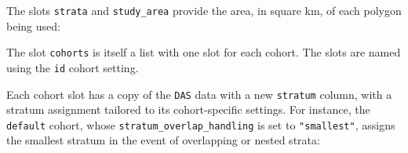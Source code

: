 \documentclass[
]{book}
\newenvironment{Shaded}{\begin{snugshade}}{\end{snugshade}}
\newcommand{\DataTypeTok}[1]{\textcolor[rgb]{0.13,0.29,0.53}{#1}}
\newcommand{\DecValTok}[1]{\textcolor[rgb]{0.00,0.00,0.81}{#1}}
\newcommand{\FloatTok}[1]{\textcolor[rgb]{0.00,0.00,0.81}{#1}}
\newcommand{\KeywordTok}[1]{\textcolor[rgb]{0.13,0.29,0.53}{\textbf{#1}}}
\newcommand{\NormalTok}[1]{#1}
\newcommand{\OperatorTok}[1]{\textcolor[rgb]{0.81,0.36,0.00}{\textbf{#1}}}
\newcommand{\StringTok}[1]{\textcolor[rgb]{0.31,0.60,0.02}{#1}}
\begin{document}
The slots \texttt{strata} and \texttt{study\_area} provide the area, in square km, of each polygon being used:

\begin{Shaded}
\end{Shaded}

\begin{Shaded}
\end{Shaded}

The slot \texttt{cohorts} is itself a list with one slot for each cohort. The slots are named using the \texttt{id} cohort setting.

\begin{Shaded}
\end{Shaded}

Each cohort slot has a copy of the \texttt{DAS} data with a new \texttt{stratum} column, with a stratum assignment tailored to its cohort-specific settings. For instance, the \texttt{default} cohort, whose \texttt{stratum\_overlap\_handling} is set to \texttt{"smallest"}, assigns the smallest stratum in the event of overlapping or nested strata:

\begin{Shaded}
\end{Shaded}
\end{document}
